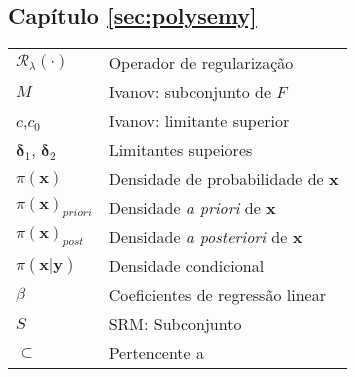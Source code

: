 \begin{multicols}{2}
\subsection*{Capítulo \ref{sec:polysemy}}

\noindent\begin{tabular}{ m{1.3cm} m{6.2cm}}
$ \mathcal{R}_{\lambda}(\cdot)$ &Operador de regularização  \\
$M$ & Ivanov: subconjunto de $F$ \\
$c$,$c_0$  & Ivanov: limitante superior \\
$\bm{\delta}_1$, $\bm{\delta}_2$ & Limitantes supeiores\\
$\pi(\mathbf{x})$ & Densidade de probabilidade de $\mathbf{x}$ \\ 
$\pi(\mathbf{x})_{priori}$ & Densidade \textit{a priori} de $\mathbf{x}$ \\ 
$\pi(\mathbf{x})_{post}$ & Densidade \textit{a posteriori} de $\mathbf{x}$ \\ 
$\pi(\mathbf{x} | \mathbf{y})$ & Densidade condicional \\ 
$\beta$ & Coeficientes de regressão linear\\
$S$ & SRM: Subconjunto\\
$\subset$ & Pertencente a \\
\end{tabular}

\end{multicols}

\newpage
\renewcommand\contentsname{SUMÁRIO}
\setcounter{tocdepth}{3} 
\tableofcontents